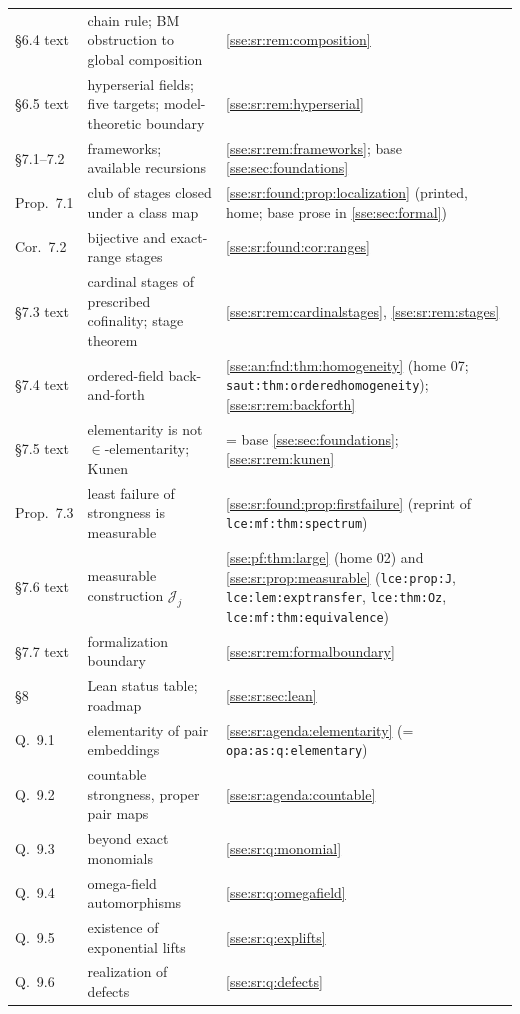\documentclass[11pt,a4paper]{article}
\numberwithin{equation}{section}
\theoremstyle{plain}
\theoremstyle{definition}
\theoremstyle{remark}
\newcommand{\lbl}[1]{\nolinkurl{#1}}%
\begin{document}
\begin{longtable}{P{17mm}P{52mm}P{79mm}}
\S6.4 text & chain rule; BM obstruction to global composition & \cref{sse:sr:rem:composition} \\
\S6.5 text & hyperserial fields; five targets; model-theoretic boundary & \cref{sse:sr:rem:hyperserial} \\
\S7.1--7.2 & frameworks; available recursions & \cref{sse:sr:rem:frameworks}; base \cref{sse:sec:foundations} \\
Prop.~7.1 & club of stages closed under a class map & \cref{sse:sr:found:prop:localization} (printed, home; base prose in \cref{sse:sec:formal}) \\
Cor.~7.2 & bijective and exact-range stages & \cref{sse:sr:found:cor:ranges} \\
\S7.3 text & cardinal stages of prescribed cofinality; stage theorem & \cref{sse:sr:rem:cardinalstages}, \cref{sse:sr:rem:stages} \\
\S7.4 text & ordered-field back-and-forth & \cref{sse:an:fnd:thm:homogeneity} (home 07; \lbl{saut:thm:orderedhomogeneity}); \cref{sse:sr:rem:backforth} \\
\S7.5 text & elementarity is not $\in$-elementarity; Kunen & = base \cref{sse:sec:foundations}; \cref{sse:sr:rem:kunen} \\
Prop.~7.3 & least failure of strongness is measurable & \cref{sse:sr:found:prop:firstfailure} (reprint of \lbl{lce:mf:thm:spectrum}) \\
\S7.6 text & measurable construction $\mathcal J_j$ & \cref{sse:pf:thm:large} (home 02) and \cref{sse:sr:prop:measurable} (\lbl{lce:prop:J}, \lbl{lce:lem:exptransfer}, \lbl{lce:thm:Oz}, \lbl{lce:mf:thm:equivalence}) \\
\S7.7 text & formalization boundary & \cref{sse:sr:rem:formalboundary} \\
\S8 & Lean status table; roadmap & \cref{sse:sr:sec:lean} \\
Q.~9.1 & elementarity of pair embeddings & \cref{sse:sr:agenda:elementarity} (= \lbl{opa:as:q:elementary}) \\
Q.~9.2 & countable strongness, proper pair maps & \cref{sse:sr:agenda:countable} \\
Q.~9.3 & beyond exact monomials & \cref{sse:sr:q:monomial} \\
Q.~9.4 & omega-field automorphisms & \cref{sse:sr:q:omegafield} \\
Q.~9.5 & existence of exponential lifts & \cref{sse:sr:q:explifts} \\
Q.~9.6 & realization of defects & \cref{sse:sr:q:defects} \\

\end{longtable}
\end{document}
